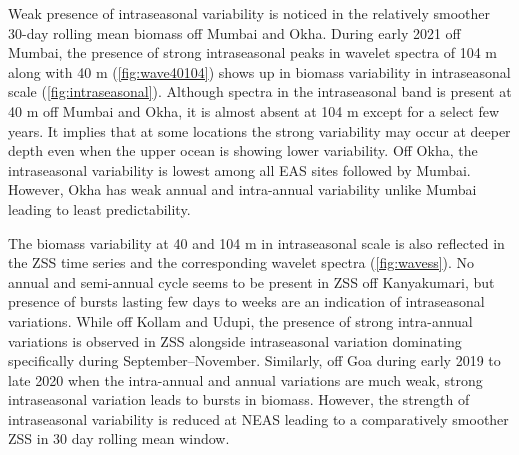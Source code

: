 \documentclass{article}
\begin{document}
	Weak presence of intraseasonal variability is noticed in the relatively smoother 30-day rolling mean biomass off Mumbai and Okha. During early 2021 off Mumbai, the presence of strong intraseasonal peaks in wavelet spectra of 104 m along with 40 m (\cref{fig:wave40104}) shows up in biomass variability in intraseasonal scale (\cref{fig:intraseasonal}). Although spectra in the intraseasonal band is present at 40 m off Mumbai and Okha, it is almost absent at 104 m  except for a select few years.  It implies that at some locations the strong variability may occur at deeper depth even when the upper ocean is showing lower variability. Off Okha, the intraseasonal variability is lowest among all EAS sites followed by Mumbai. However, Okha has weak annual and intra-annual variability unlike Mumbai leading to least predictability.
	
	The biomass variability at 40 and 104 m in intraseasonal scale is also reflected in the ZSS time series and the corresponding wavelet spectra (\cref{fig:wavess}). No annual and semi-annual cycle seems to be present in ZSS off Kanyakumari, but presence of bursts lasting few days to weeks are an indication of intraseasonal variations. While off Kollam and Udupi, the presence of strong intra-annual variations is observed in ZSS alongside intraseasonal variation dominating specifically during September--November. Similarly, off Goa during early 2019 to late 2020 when the intra-annual and annual variations are much weak, strong intraseasonal variation leads to bursts in biomass. However, the strength of intraseasonal variability is reduced at NEAS leading to a comparatively smoother ZSS in 30 day rolling mean window.
	
\end{document}
